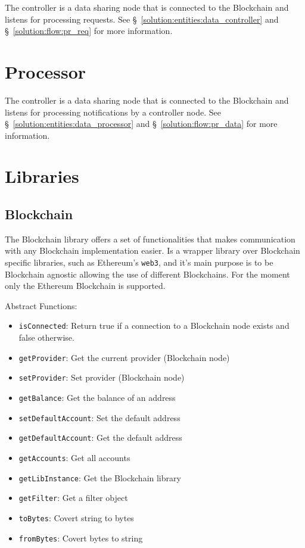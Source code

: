The controller is a data sharing node that is connected to the Blockchain and listens for processing requests. See §~\ref{solution:entities:data_controller} and §~\ref{solution:flow:pr_req} for more information.

\section{Processor}
\label{implemenation:processor}

The controller is a data sharing node that is connected to the Blockchain and listens for processing notifications by a controller node.  See §~\ref{solution:entities:data_processor} and §~\ref{solution:flow:pr_data} for more information.

\section{Libraries}
\label{implemenation:libs}

\subsection{Blockchain}
\label{implemenation:libs:bl}

The Blockchain library offers a set of functionalities that makes communication with any Blockchain implementation easier. Is a wrapper library over Blockchain specific libraries, such as Ethereum's \verb|web3|, and it's main purpose is to be Blockchain agnostic allowing the use of different Blockchains. For the moment only the Ethereum Blockchain is supported.

Abstract Functions:

\begin{itemize}
  \item \verb|isConnected|: Return true if a connection to a Blockchain node exists and false otherwise.
  \item \verb|getProvider|: Get the current provider (Blockchain node)
  \item \verb|setProvider|: Set provider (Blockchain node)
  \item \verb|getBalance|: Get the balance of an address
  \item \verb|setDefaultAccount|: Set the default address
  \item \verb|getDefaultAccount|: Get the default address
  \item \verb|getAccounts|: Get all accounts
  \item \verb|getLibInstance|: Get the Blockchain library
  \item \verb|getFilter|: Get a filter object
  \item \verb|toBytes|: Covert string to bytes
  \item \verb|fromBytes|: Covert bytes to string
\end{itemize}

